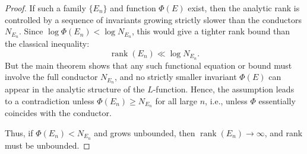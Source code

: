 \documentclass[10pt,a4paper]{amsart}
\begin{document}
	\begin{proof}
		If such a family \( \{E_n\} \) and function \( \Phi(E) \) exist, then the analytic rank is controlled by a sequence of invariants growing strictly slower than the conductors \( N_{E_n} \). Since \( \log \Phi(E_n) < \log N_{E_n} \), this would give a tighter rank bound than the classical inequality:
		\[
		\operatorname{rank}(E_n) \ll \log N_{E_n}.
		\]
		But the main theorem shows that any such functional equation or bound must involve the full conductor \( N_{E_n} \), and no strictly smaller invariant \( \Phi(E) \) can appear in the analytic structure of the \( L \)-function. Hence, the assumption leads to a contradiction unless \( \Phi(E_n) \ge N_{E_n} \) for all large \( n \), i.e., unless \( \Phi \) essentially coincides with the conductor.
		
		Thus, if \( \Phi(E_n) < N_{E_n} \) and grows unbounded, then \( \operatorname{rank}(E_n) \to \infty \), and rank must be unbounded.
	\end{proof}
\end{document}
